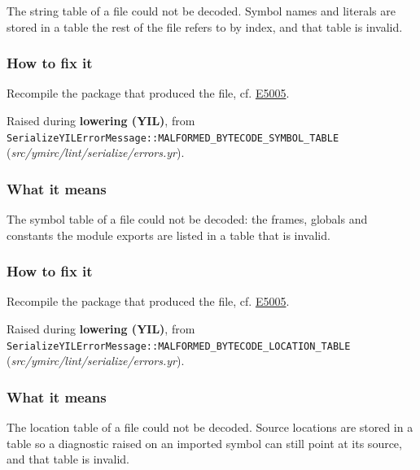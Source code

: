 The string table of a  file could not be decoded. Symbol names and literals are stored in a table the rest of the file refers to by index, and that table is invalid.

\subsubsection*{How to fix it}

Recompile the package that produced the file, cf. \hyperref[sec:codes:e5005]{E5005}.

\label{sec:codes:e5008}

Raised during \textbf{lowering (YIL)}, from \texttt{SerializeYILErrorMessage::\allowbreak{}MALFORMED\_\allowbreak{}BYTECODE\_\allowbreak{}SYMBOL\_\allowbreak{}TABLE} (\textit{src/\allowbreak{}ymirc/\allowbreak{}lint/\allowbreak{}serialize/\allowbreak{}errors.yr}).

\subsubsection*{What it means}

The symbol table of a  file could not be decoded: the frames, globals and constants the module exports are listed in a table that is invalid.

\subsubsection*{How to fix it}

Recompile the package that produced the file, cf. \hyperref[sec:codes:e5005]{E5005}.

\label{sec:codes:e5009}

Raised during \textbf{lowering (YIL)}, from \texttt{SerializeYILErrorMessage::\allowbreak{}MALFORMED\_\allowbreak{}BYTECODE\_\allowbreak{}LOCATION\_\allowbreak{}TABLE} (\textit{src/\allowbreak{}ymirc/\allowbreak{}lint/\allowbreak{}serialize/\allowbreak{}errors.yr}).

\subsubsection*{What it means}

The location table of a  file could not be decoded. Source locations are stored in a table so a diagnostic raised on an imported symbol can still point at its source, and that table is invalid.

